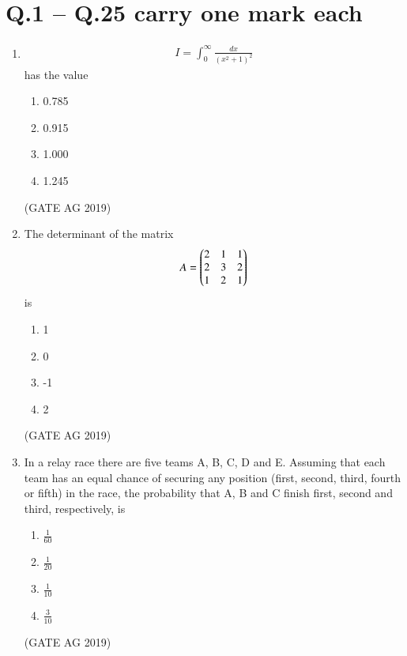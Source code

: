 \documentclass[journal,12pt,onecolumn]{IEEEtran}
\theoremstyle{remark}
\begin{document}
\section*{Q.1 -- Q.25 carry one mark each}

\begin{enumerate}

\item 
\begin{align*}
I = \int_{0}^{\infty} \frac{dx}{(x^2 + 1)^2}
\end{align*}
has the value
\begin{multicols}{4}
\begin{enumerate}
    \item 0.785
    \item 0.915
    \item 1.000
    \item 1.245
\end{enumerate}
\end{multicols}
\hfill{(GATE AG 2019)}

\item The determinant of the matrix 
\[
A = \begin{pmatrix} 2 & 1 & 1 \\ 2 & 3 & 2 \\ 1 & 2 & 1 \end{pmatrix}
\]
is

\begin{multicols}{4}
\begin{enumerate}
    \item 1
    \item 0
    \item -1
    \item 2
\end{enumerate}
\end{multicols}
\hfill{(GATE AG 2019)}

\item In a relay race there are five teams A, B, C, D and E. Assuming that each team has an equal chance of securing any position (first, second, third, fourth or fifth) in the race, the probability that A, B and C finish first, second and third, respectively, is
\begin{multicols}{4}
\begin{enumerate}
    \item $\frac{1}{60}$
    \item $\frac{1}{20}$
    \item $\frac{1}{10}$
    \item $\frac{3}{10}$
\end{enumerate}
\end{multicols}
\hfill{(GATE AG 2019)}


\end{enumerate}
\end{document}

